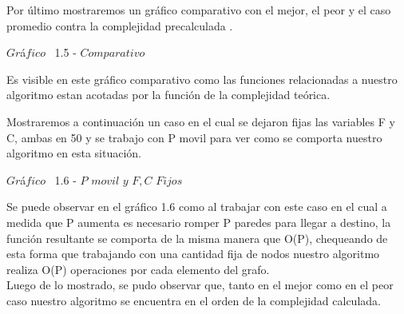 Por \'ultimo mostraremos un gr\'afico comparativo con el mejor, el peor y el caso promedio contra la complejidad precalculada .\\

  
  \vspace*{0.3cm} \vspace*{0.3cm}
  \begin{center}
{$Gr$\'a$fico$ \ 1.5 - $Comparativo$}
  \end{center}
  \vspace*{0.3cm}
  
 Es visible en este gr\'afico comparativo como las funciones relacionadas a nuestro algoritmo estan acotadas por la funci\'on de la complejidad te\'orica.

Mostraremos a continuaci\'on un caso en el cual se dejaron fijas las variables F y C, ambas en 50 y se trabajo con P movil para ver como se comporta nuestro algoritmo en esta situaci\'on.

\vspace*{0.3cm} \vspace*{0.3cm}
  \begin{center}
{$Gr$\'a$fico$ \ 1.6 - $P$ $movil$ $y$ $F,C$ $Fijos$}
  \end{center}
  \vspace*{0.3cm}

Se puede observar en el gr\'afico 1.6 como al trabajar con este caso en el cual a medida que P aumenta es necesario romper P paredes para llegar a destino, la funci\'on resultante se comporta de la misma manera que O(P), chequeando de esta forma que trabajando con una cantidad fija de nodos nuestro algoritmo realiza O(P) operaciones por cada elemento del grafo.\\

Luego de lo mostrado, se pudo observar que, tanto en el mejor como en el peor caso nuestro algoritmo se encuentra en el orden de la complejidad calculada.